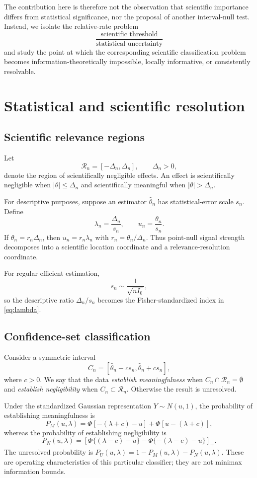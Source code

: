 \documentclass[11pt]{article}
\theoremstyle{remark}
\begin{document}
The contribution here is therefore not the observation that scientific importance differs from statistical significance, nor the proposal of another interval-null test. Instead, we isolate the relative-rate problem
\[
\frac{\text{scientific threshold}}{\text{statistical uncertainty}}
\]
and study the point at which the corresponding scientific classification problem becomes information-theoretically impossible, locally informative, or consistently resolvable.

\section{Statistical and scientific resolution}

\subsection{Scientific relevance regions}

Let
\[
\mathcal R_n=[-\Delta_n,\Delta_n],\qquad \Delta_n>0,
\]
denote the region of scientifically negligible effects. An effect is scientifically negligible when $|\theta|\le\Delta_n$ and scientifically meaningful when $|\theta|>\Delta_n$.

For descriptive purposes, suppose an estimator $\hat\theta_n$ has statistical-error scale $s_n$. Define
\[
\lambda_n=\frac{\Delta_n}{s_n},
\qquad
u_n=\frac{\theta_n}{s_n}.
\]
If $\theta_n=r_n\Delta_n$, then $u_n=r_n\lambda_n$ with $r_n=\theta_n/\Delta_n$. Thus point-null signal strength decomposes into a scientific location coordinate and a relevance-resolution coordinate.

For regular efficient estimation,
\[
s_n\sim \frac{1}{\sqrt{nI_0}},
\]
so the descriptive ratio $\Delta_n/s_n$ becomes the Fisher-standardized index in \eqref{eq:lambda}.

\subsection{Confidence-set classification}

Consider a symmetric interval
\[
C_n=[\hat\theta_n-cs_n,\hat\theta_n+cs_n],
\]
where $c>0$. We say that the data \emph{establish meaningfulness} when $C_n\cap\mathcal R_n=\emptyset$ and \emph{establish negligibility} when $C_n\subset\mathcal R_n$. Otherwise the result is unresolved.

Under the standardized Gaussian representation $Y\sim N(u,1)$, the probability of establishing meaningfulness is
\begin{equation}
P_M(u,\lambda)
=
\Phi[-(\lambda+c)-u]
+
\Phi[u-(\lambda+c)],
\label{eq:pm}
\end{equation}
whereas the probability of establishing negligibility is
\begin{equation}
P_N(u,\lambda)
=
\left[
\Phi\{(\lambda-c)-u\}
-
\Phi\{-(\lambda-c)-u\}
\right]_+.
\label{eq:pn}
\end{equation}
The unresolved probability is $P_U(u,\lambda)=1-P_M(u,\lambda)-P_N(u,\lambda)$. These are operating characteristics of this particular classifier; they are not minimax information bounds.
\end{document}
